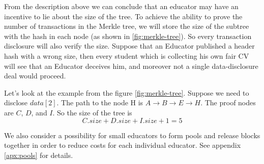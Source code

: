 From the description above we can conclude that an educator may have an incentive to lie about the size of the tree. To achieve the ability to prove the number of transactions in the Merkle tree,
we will store the size of the subtree with the hash in each node (as shown in \ref{fig:merkle-tree}). So every transaction disclosure will also verify the size. Suppose that an Educator published a header hash with a wrong size, then every student which is collecting his own fair CV will see that an Educator deceives him, and moreover not a single data-disclosure deal would proceed.

Let's look at the example from the figure \ref{fig:merkle-tree}. Suppose we need to disclose $data[2]$. The path to the node H is $A \rightarrow B \rightarrow E \rightarrow H$. The proof nodes are $C$, $D$, and $I$. So the size of the tree is $$C.size+D.size+I.size+1=5$$

We also consider a possibility for small educators to form pools and release
blocks together in order to reduce costs for each individual educator. See
appendix \ref{apx:pools} for details.
